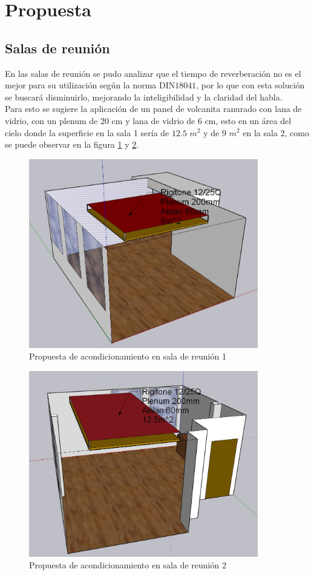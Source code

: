 \section{Propuesta}
\subsection{Salas de reunión}
En las salas de reunión se pudo analizar que el tiempo de reverberación no es el mejor para su 
utilización según la norma DIN$18041$, por lo que con esta solución se buscará disminuirlo, 
mejorando la inteligibilidad y la claridad del habla.\\
Para esto se sugiere la aplicación de un panel de volcanita ranurado con lana de vidrio, con un 
plenum de $20$ cm y lana de vidrio de $6$ cm, esto en un área del cielo donde la superficie en la sala 1 sería de  $12.5$ $m^2$ 
y de $9$ $m^2$ en la sala $2$, como se puede observar en la figura \ref{fig:propuesta_reunion1} y \ref{fig:propuesta_reunion2}.

\begin{figure}[H]
    \centering
    \includegraphics[width=10cm]{Imagenes/Propuesta/propuesta_reunion1.jpg}
    \caption{Propuesta de acondicionamiento en sala de reunión 1}
    \label{fig:propuesta_reunion1}
\end{figure}

\begin{figure}[H]
    \centering
    \includegraphics[width=10cm]{Imagenes/Propuesta/propuesta_reunion2.jpg}
    \caption{Propuesta de acondicionamiento en sala de reunión 2}
    \label{fig:propuesta_reunion2}
\end{figure}

